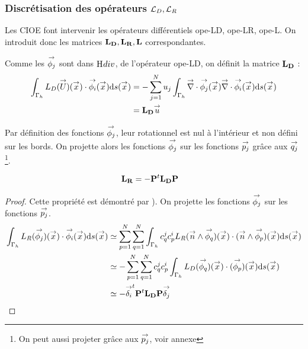     \subsubsection[Discrétisation des opérateurs LD, LR]{Discrétisation des opérateurs \(\LD,\LR\)}
      Les CIOE font intervenir les opérateurs différentiels \gls{ope-LD}, \gls{ope-LR}, \gls{ope-L}. On introduit donc les matrices \(\mLD,\mLR,\mL\) correspondantes.

      Comme les \(\phij\) sont dans \(\Hdiv\), de l'opérateur \gls{ope-LD}, on définit la matrice \(\mLD\) :
      \begin{align}
        \int_{\Gamma_h} L_D(\vect{U})(\vx) \cdot \phii(\vx) \dd{s}(\vx)
          & = - \sum_{j=1}^N u_j \int_{\Gamma_h} \vdiv \phij(\vx) \vdiv \phii(\vx) \dd{s}(\vx) \\
          & = \mLD \vu
      \end{align}

      Par définition des fonctions \(\phij\), leur rotationnel est nul à l'intérieur et non défini sur les bords. On projette alors les fonctions \(\phij\) sur les fonctions \(\pj\) grâce aux \(\qj\) \footnote{On peut aussi projeter grâce aux \(\pj\), voir annexe}.

      \begin{prop}
        \begin{align}
          \mLR & = -\mPP^t\mLD\mPP
        \end{align}
      \end{prop}
      \begin{proof}
        Cette propriété est démontré par \cite[eq.~(13)]{stupfel_implementation_2015}). On projette les fonctions \(\phij\) sur les fonctions \(\pj\).
        \begin{equation}
          \begin{aligned}
            \int_{\Gamma_h} L_R (\phij) (\vx) \cdot \phii(\vx) \dd{s}(\vx) & \simeq \sum_{p=1}^{N} \sum_{q=1}^{N} \int_{\Gamma_h} c_q^j c_p^i L_R (\vn \pvect \phiq) (\vx) \cdot (\vn \pvect \phip)(\vx) \dd{s}(\vx)
            \\
            & \simeq -\sum_{p=1}^{N} \sum_{q=1}^{N} c_q^j c_p^i \int_{\Gamma_h} L_D (\phiq) (\vx) \cdot (\phip)(\vx) \dd{s}(\vx)
            \\
            & \simeq -\vect{\delta_i}^t \mPP^t \mLD \mPP \vect{\delta_j}
          \end{aligned}
        \end{equation}
      \end{proof}

